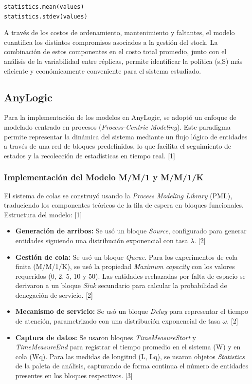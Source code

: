 \documentclass{article}
\begin{document}
\begin{verbatim}
statistics.mean(values)
statistics.stdev(values)
\end{verbatim}

A través de los costos de ordenamiento, mantenimiento y faltantes, el modelo cuantifica los distintos compromisos asociados a la gestión del stock. La combinación de estos componentes en el costo total promedio, junto con el análisis de la variabilidad entre réplicas, permite identificar la política (s,S) más eficiente y económicamente conveniente para el sistema estudiado.




\subsection{AnyLogic}

Para la implementación de los modelos en AnyLogic, se adoptó un enfoque de modelado centrado en procesos (\textit{Process-Centric Modeling}). Este paradigma permite representar la dinámica del sistema mediante un flujo lógico de entidades a través de una red de bloques predefinidos, lo que facilita el seguimiento de estados y la recolección de estadísticas en tiempo real. [1]

\subsubsection{Implementación del Modelo M/M/1 y M/M/1/K}
El sistema de colas se construyó usando la \textit{Process Modeling Library} (PML), traduciendo los componentes teóricos de la fila de espera en bloques funcionales. Estructura del modelo: [1]

\begin{itemize}
    \item \textbf{Generación de arribos:} Se usó un bloque \textit{Source}, configurado para generar entidades siguiendo una distribución exponencial con tasa $\lambda$. [2]
    \item \textbf{Gestión de cola:} Se usó un bloque \textit{Queue}. Para los experimentos de cola finita (M/M/1/K), se usó la propiedad \textit{Maximum capacity} con los valores requeridos (0, 2, 5, 10 y 50). Las entidades rechazadas por falta de espacio se derivaron a un bloque \textit{Sink} secundario para calcular la probabilidad de denegación de servicio. [2]
    \item \textbf{Mecanismo de servicio:} Se usó un bloque \textit{Delay} para representar el tiempo de atención, parametrizado con una distribución exponencial de tasa $\omega$. [2]
    \item \textbf{Captura de datos:} Se usaron bloques \textit{TimeMeasureStart} y \textit{TimeMeasureEnd} para registrar el tiempo promedio en el sistema (W) y en cola (Wq). Para las medidas de longitud (L, Lq), se usaron objetos \textit{Statistics} de la paleta de análisis, capturando de forma continua el número de entidades presentes en los bloques respectivos. [3]
\end{itemize}
\end{document}
